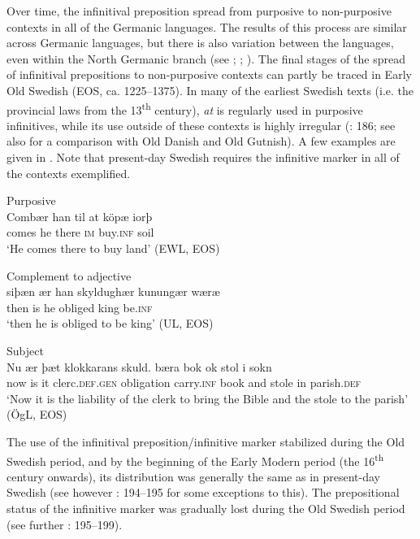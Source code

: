 \documentclass[output=paper]{langscibook}
\begin{document}
Over time, the infinitival preposition spread from purposive to non-purposive contexts in all of the Germanic languages. The results of this process are similar across Germanic languages, but there is also variation between the languages, even within the North Germanic branch (see \citealt{Haspelmath1989}; \citealt{Los2005}; \citealt{Kalm2016Prepositioner, Kalm2016Satsekvivalenta,Kalm2019}). The final stages of the spread of infinitival prepositions to non-purposive contexts can partly be traced in Early Old Swedish (EOS, ca. 1225–1375). In many of the earliest Swedish texts (i.e. the provincial laws from the 13\textsuperscript{th} century), \textit{at} is regularly used in purposive infinitives, while its use outside of these contexts is highly irregular (\citealt{Kalm2016Satsekvivalenta}: 186; see also \citealt{Kalm2019} for a comparison with Old Danish and Old Gutnish). A few examples are given in . Note that present-day Swedish requires the infinitive marker in all of the contexts exemplified. 


\ea
\label{ex:kalm:4}
\ea Purposive\\\label{ex:kalm:4a}
\gll Combær han til at köpæ iorþ\\ 
comes he there \textsc{im} buy.\textsc{inf} soil\\
\glt‘He comes there to buy land’ (EWL, EOS) 

\ex Complement to adjective\\\label{ex:kalm:4b}
\gll siþæn ær han skyldughær kunungær wæræ\\
 then is he obliged king be.\textsc{inf}\\
\glt ‘then he is obliged to be king’ (UL, EOS)
 
\ex Subject\\\label{ex:kalm:4c}
\gll Nu ær þæt klokkarans skuld. bæra bok ok stol i sokn\\
now is it clerc.\textsc{def.gen} obligation carry.\textsc{inf} book and stole in parish.\textsc{def}\\
\glt ‘Now it is the liability of the clerk to bring the Bible and the stole to the parish’ (ÖgL, EOS)
\z 
\z 



The use of the infinitival preposition/infinitive marker stabilized during the Old Swedish period, and by the beginning of the Early Modern period (the 16\textsuperscript{th} century onwards), its distribution was generally the same as in present-day Swedish (see however \citealt{Hellquist1902}: 194–195 for some exceptions to this). The prepositional status of the infinitive marker was gradually lost during the Old Swedish period (see further \citealt{Kalm2016Satsekvivalenta}: 195–199). 
\end{document}
